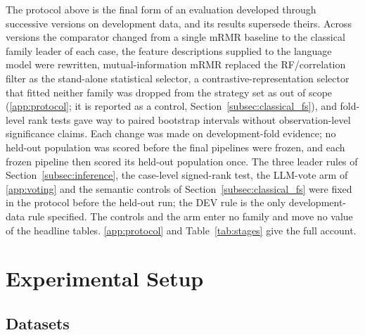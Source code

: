\documentclass[final,5p,twocolumn]{elsarticle}
\begin{document}
The protocol above is the final form of an evaluation developed through successive versions on development data, and its results supersede theirs. Across versions the comparator changed from a single mRMR baseline to the classical family leader of each case, the feature descriptions supplied to the language model were rewritten, mutual-information mRMR replaced the RF/correlation filter as the stand-alone statistical selector, a contrastive-representation selector that fitted neither family was dropped from the strategy set as out of scope (\ref{app:protocol}; it is reported as a control, Section~\ref{subsec:classical_fs}), and fold-level rank tests gave way to paired bootstrap intervals without observation-level significance claims. Each change was made on development-fold evidence; no held-out population was scored before the final pipelines were frozen, and each frozen pipeline then scored its held-out population once. The three leader rules of Section~\ref{subsec:inference}, the case-level signed-rank test, the LLM-vote arm of \ref{app:voting} and the semantic controls of Section~\ref{subsec:classical_fs} were fixed in the protocol before the held-out run; the DEV rule is the only development-data rule specified. The controls and the arm enter no family and move no value of the headline tables. \ref{app:protocol} and Table~\ref{tab:stages} give the full account.


\section{Experimental Setup}
\label{sec:experimental_setup}

\subsection{Datasets}
\label{subsec:datasets}
\end{document}

